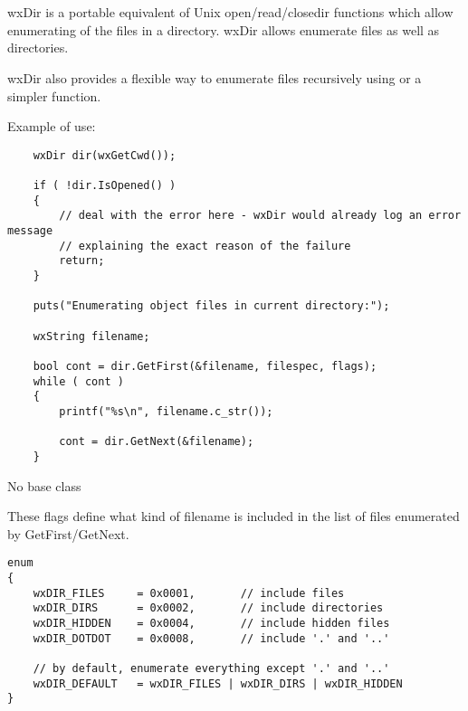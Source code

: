 
\section{}\label{wxdir}

wxDir is a portable equivalent of Unix {open/read/close}dir functions which
allow enumerating of the files in a directory. wxDir allows enumerate files as
well as directories.

wxDir also provides a flexible way to enumerate files recursively using 
 or a simpler 
 function.

Example of use:

\begin{verbatim}
    wxDir dir(wxGetCwd());

    if ( !dir.IsOpened() )
    {
        // deal with the error here - wxDir would already log an error message
        // explaining the exact reason of the failure
        return;
    }

    puts("Enumerating object files in current directory:");

    wxString filename;

    bool cont = dir.GetFirst(&filename, filespec, flags);
    while ( cont )
    {
        printf("%s\n", filename.c_str());

        cont = dir.GetNext(&filename);
    }
\end{verbatim}


No base class


These flags define what kind of filename is included in the list of files
enumerated by GetFirst/GetNext.

{\small
\begin{verbatim}
enum
{
    wxDIR_FILES     = 0x0001,       // include files
    wxDIR_DIRS      = 0x0002,       // include directories
    wxDIR_HIDDEN    = 0x0004,       // include hidden files
    wxDIR_DOTDOT    = 0x0008,       // include '.' and '..'

    // by default, enumerate everything except '.' and '..'
    wxDIR_DEFAULT   = wxDIR_FILES | wxDIR_DIRS | wxDIR_HIDDEN
}
\end{verbatim}
}

